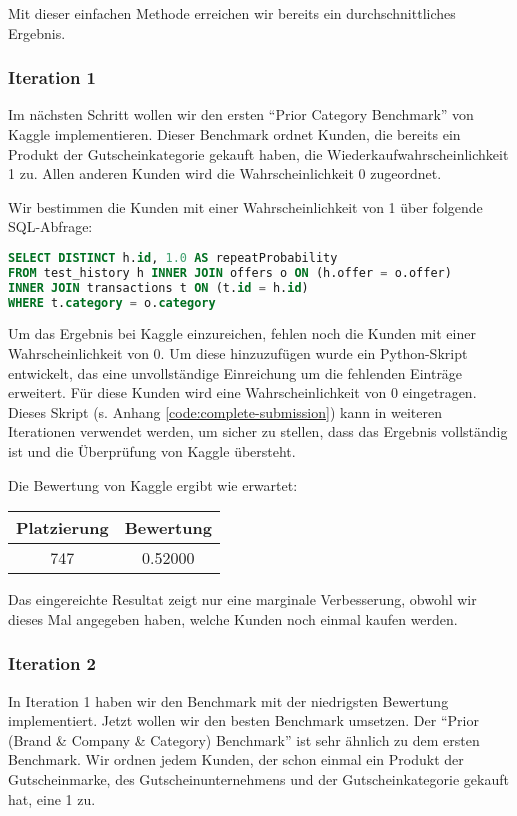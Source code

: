 Mit dieser einfachen Methode erreichen wir bereits ein durchschnittliches Ergebnis.

\subsubsection{Iteration 1}

Im nächsten Schritt wollen wir den ersten "`Prior Category Benchmark"' von Kaggle implementieren.
Dieser Benchmark ordnet Kunden, die bereits ein Produkt der Gutscheinkategorie gekauft haben, die
Wiederkaufwahrscheinlichkeit 1 zu. Allen anderen Kunden wird die Wahrscheinlichkeit 0 zugeordnet.

Wir bestimmen die Kunden mit einer Wahrscheinlichkeit von 1 über folgende SQL-Abfrage:
\begin{lstlisting}[language=SQL]
SELECT DISTINCT h.id, 1.0 AS repeatProbability
FROM test_history h INNER JOIN offers o ON (h.offer = o.offer)
INNER JOIN transactions t ON (t.id = h.id)
WHERE t.category = o.category
\end{lstlisting}

Um das Ergebnis bei Kaggle einzureichen, fehlen noch die Kunden mit einer Wahrscheinlichkeit von 0.
Um diese hinzuzufügen wurde ein Python-Skript entwickelt, das eine unvollständige Einreichung
um die fehlenden Einträge erweitert. Für diese Kunden wird eine Wahrscheinlichkeit von 0 eingetragen.
Dieses Skript (s. Anhang \ref{code:complete-submission}) kann in weiteren Iterationen verwendet werden,
um sicher zu stellen, dass das Ergebnis vollständig ist und die Überprüfung von Kaggle übersteht. 

Die Bewertung von Kaggle ergibt wie erwartet:

\begin{tabular}{|c|c|}
	\hline \textbf{Platzierung} & \textbf{Bewertung} \\ 
	\hline 747 & 0.52000  \\ 
	\hline 
\end{tabular}

Das eingereichte Resultat zeigt nur eine marginale Verbesserung, obwohl wir dieses Mal angegeben haben, welche Kunden noch einmal kaufen werden.

\subsubsection{Iteration 2}

In Iteration 1 haben wir den Benchmark mit der niedrigsten Bewertung implementiert. Jetzt wollen wir 
den besten Benchmark umsetzen. Der "`Prior (Brand \& Company \& Category) Benchmark"' ist sehr ähnlich
zu dem ersten Benchmark. Wir ordnen jedem Kunden, der schon einmal ein Produkt der Gutscheinmarke,
des Gutscheinunternehmens und der Gutscheinkategorie gekauft hat, eine 1 zu. 

